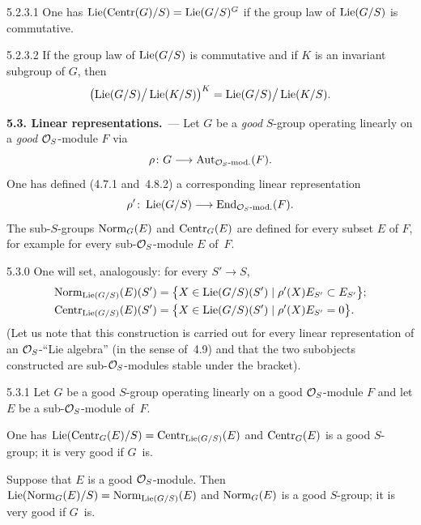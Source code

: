 \begin{corollary}{5.2.3.1}
\label{II.5.2.3.1}
One has \(\operatorname{Lie}(\operatorname{Centr}(G)/S)=\operatorname{Lie}(G/S)^{G}\) if the group law of
\(\operatorname{Lie}(G/S)\) is commutative.
\end{corollary}

\begin{corollary}{5.2.3.2}
\label{II.5.2.3.2}
If the group law of \(\operatorname{Lie}(G/S)\) is commutative and if \(K\) is an
invariant subgroup of \(G\), then
\[
\bigl(\operatorname{Lie}(G/S)\big/\operatorname{Lie}(K/S)\bigr)^{K}
=\operatorname{Lie}(G/S)\big/\operatorname{Lie}(K/S).
\]
\end{corollary}

\par{}%
\noindent\textbf{5.3. Linear representations.}\ ---
\label{II.5.3}
Let \(G\) be a \emph{good} \(S\)-group operating linearly on a \emph{good}
\(\mathcal{O}_S\)-module \(F\) via
\[
\rho\colon G\longrightarrow\operatorname{Aut}_{\mathcal{O}_S\text{-mod.}}(F).
\]
One has defined (4.7.1 and~4.8.2) a corresponding linear representation
\[
\rho'\colon\operatorname{Lie}(G/S)\longrightarrow\operatorname{End}_{\mathcal{O}_S\text{-mod.}}(F).
\]
The sub-\(S\)-groups \(\operatorname{Norm}_G(E)\) and \(\operatorname{Centr}_G(E)\) are defined for every
subset \(E\) of \(F\), for example for every sub-\(\mathcal{O}_S\)-module \(E\) of~\(F\).

\begin{definition}{5.3.0}
\label{II.5.3.0}
One will set, analogously: for every \(S'\to S\),
\begin{align*}
\operatorname{Norm}_{\operatorname{Lie}(G/S)}(E)(S')
&=
\bigl\{X\in\operatorname{Lie}(G/S)(S')\mid \rho'(X)E_{S'}\subset E_{S'}\bigr\};\\
\operatorname{Centr}_{\operatorname{Lie}(G/S)}(E)(S')
&=
\bigl\{X\in\operatorname{Lie}(G/S)(S')\mid \rho'(X)E_{S'}=0\bigr\}.
\end{align*}
(Let us note that this construction is carried out for every linear
representation of an \(\mathcal{O}_S\)-``Lie algebra'' (in the sense of~4.9) and that
the two subobjects constructed are sub-\(\mathcal{O}_S\)-modules stable under the
bracket).
\end{definition}

\begin{theorem}{5.3.1}
\label{II.5.3.1}
Let \(G\) be a good \(S\)-group operating linearly on a good \(\mathcal{O}_S\)-module
\(F\) and let \(E\) be a sub-\(\mathcal{O}_S\)-module of~\(F\).
\begin{enumeratei}
\item One has \(\operatorname{Lie}(\operatorname{Centr}_G(E)/S)=\operatorname{Centr}_{\operatorname{Lie}(G/S)}(E)\) and
\(\operatorname{Centr}_G(E)\) is a good \(S\)-group; it is very good if \(G\)~is.
\item Suppose that \(E\) is a good \(\mathcal{O}_S\)-module. Then%
{\renewcommand{\thefootnote}{(98)}}
\(\operatorname{Lie}(\operatorname{Norm}_G(E)/S)=\operatorname{Norm}_{\operatorname{Lie}(G/S)}(E)\) and \(\operatorname{Norm}_G(E)\) is a good
\(S\)-group; it is very good if \(G\)~is.
\end{enumeratei}
\end{theorem}


